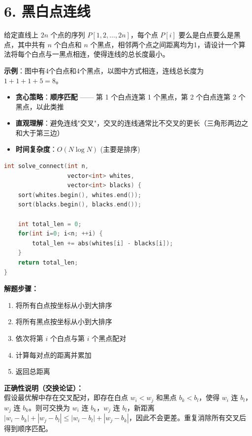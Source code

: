 \section*{6. 黑白点连线}

给定直线上 $2n$ 个点的序列 $P[1,2,\ldots,2n]$，每个点 $P[i]$ 要么是白点要么是黑点，其中共有 $n$ 个白点和 $n$ 个黑点，相邻两个点之间距离均为1，请设计一个算法将每个白点与一黑点相连，使得连线的总长度最小。

\textbf{示例}：图中有4个白点和4个黑点，以图中方式相连，连线总长度为 $1+1+1+5=8$。

\begin{itemize}
    \item \textbf{贪心策略}：\textbf{顺序匹配} —— 第 1 个白点连第 1 个黑点，第 2 个白点连第 2 个黑点，以此类推
    \item \textbf{直观理解}：避免连线"交叉"，交叉的连线通常比不交叉的更长（三角形两边之和大于第三边）
    \item \textbf{时间复杂度}：$O(N \log N)$ (主要是排序)
\end{itemize}

\begin{lstlisting}[language=C++, style=cppstyle]
int solve_connect(int n,
                  vector<int> whites,
                  vector<int> blacks) {
    sort(whites.begin(), whites.end());
    sort(blacks.begin(), blacks.end());

    int total_len = 0;
    for(int i=0; i<n; ++i) {
        total_len += abs(whites[i] - blacks[i]);
    }
    return total_len;
}
\end{lstlisting}

\textbf{解题步骤：}
\begin{enumerate}
    \item 将所有白点按坐标从小到大排序
    \item 将所有黑点按坐标从小到大排序
    \item 依次将第 $i$ 个白点与第 $i$ 个黑点配对
    \item 计算每对点的距离并累加
    \item 返回总距离
\end{enumerate}

\textbf{正确性说明（交换论证）：}\\
假设最优解中存在交叉配对，即存在白点 $w_i < w_j$ 和黑点 $b_k < b_l$，使得 $w_i$ 连 $b_l$，$w_j$ 连 $b_k$。则可交换为 $w_i$ 连 $b_k$，$w_j$ 连 $b_l$，新距离 $|w_i-b_k| + |w_j-b_l| \le |w_i-b_l| + |w_j-b_k|$，因此不会更差。重复消除所有交叉后得到顺序匹配。
